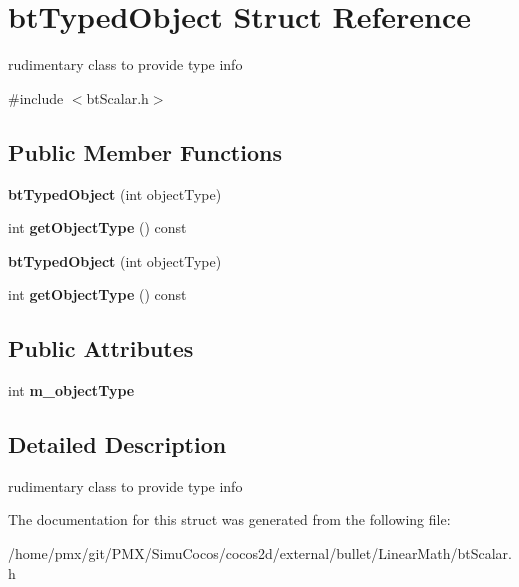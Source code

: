 \hypertarget{structbtTypedObject}{}\section{bt\+Typed\+Object Struct Reference}
\label{structbtTypedObject}


rudimentary class to provide type info  




{\ttfamily \#include $<$bt\+Scalar.\+h$>$}

\subsection*{Public Member Functions}
\begin{DoxyCompactItemize}
\item 
\mbox{\label{structbtTypedObject_a39d6ebc8daec78efccbcac59f64e7274}} 
{\bfseries bt\+Typed\+Object} (int object\+Type)
\item 
\mbox{\label{structbtTypedObject_adfb579a83ddb3321479ecb26734caa62}} 
int {\bfseries get\+Object\+Type} () const
\item 
\mbox{\label{structbtTypedObject_a39d6ebc8daec78efccbcac59f64e7274}} 
{\bfseries bt\+Typed\+Object} (int object\+Type)
\item 
\mbox{\label{structbtTypedObject_adfb579a83ddb3321479ecb26734caa62}} 
int {\bfseries get\+Object\+Type} () const
\end{DoxyCompactItemize}
\subsection*{Public Attributes}
\begin{DoxyCompactItemize}
\item 
\mbox{\label{structbtTypedObject_ad480e8d21b894fff4485239651fc23e6}} 
int {\bfseries m\+\_\+object\+Type}
\end{DoxyCompactItemize}


\subsection{Detailed Description}
rudimentary class to provide type info 

The documentation for this struct was generated from the following file\+:\begin{DoxyCompactItemize}
\item 
/home/pmx/git/\+P\+M\+X/\+Simu\+Cocos/cocos2d/external/bullet/\+Linear\+Math/bt\+Scalar.\+h\end{DoxyCompactItemize}
